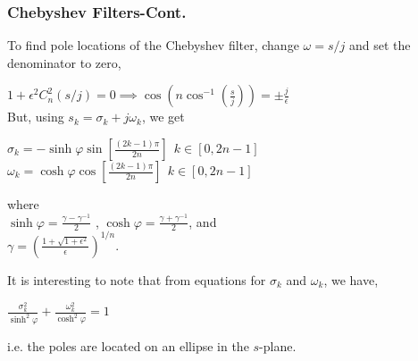 \documentclass[mathserif, 10pt]{beamer} %
\begin{document}
\frame
{

\small
\frametitle{Chebyshev Filters-Cont. }

To find pole locations of the Chebyshev filter, change $\omega=s/j$ and set the denominator to zero, \\ \vspace{.1in}

$1+\epsilon^2C_n^2(s/j)=0 \implies \cos{(n\cos^{-1}(\frac{s}{j}))}=\pm \frac{j}{\epsilon}$ \\ \vspace{.1in}
But, using $s_k=\sigma_k+ j \omega_k$, we get \\ \vspace{.1in}

$\sigma_k =-\sinh \varphi \sin [\frac{(2k-1)\pi}{2n}] ~~ k \in [0,2n-1]$ \\ \vspace{.1in}
$\omega_k =\cosh \varphi \cos [\frac{(2k-1)\pi}{2n}] ~~ k \in [0,2n-1]$ \\ \vspace{.1in}

where \\

$\sinh \varphi= \frac{\gamma-\gamma^{-1}}{2}$ \hspace{.1in} , \hspace{.1in} $\cosh \varphi= \frac{\gamma+\gamma^{-1}}{2}$, and \\
$\gamma = (\frac{1+\sqrt{1+\epsilon^2}}{\epsilon})^{1/n}$. \vspace{.1in}

It is interesting to note that from equations for $\sigma_k$  and $\omega_k$, we have, \\ \vspace{.1in}

$\frac{\sigma^2_k}{\sinh^2 \varphi}+\frac{\omega^2_k}{\cosh^2 \varphi}=1$ \\ \vspace{.14in}

i.e. the poles are located on an ellipse in the $s$-plane.


}
\end{document}
